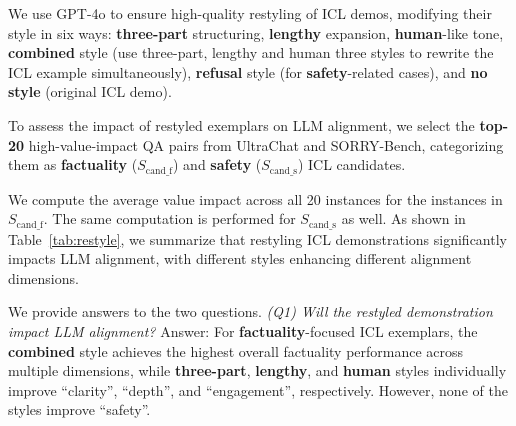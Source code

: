 
We use GPT-4o to ensure high-quality restyling of ICL demos, modifying their style in six ways: \textbf{three-part} structuring, \textbf{lengthy} expansion, \textbf{human}-like tone, \textbf{combined} style (use three-part, lengthy and human three styles to rewrite the ICL example simultaneously), \textbf{refusal} style (for \textbf{\color{myred} safety}-related cases), and \textbf{no style} (original ICL demo).

To assess the impact of restyled exemplars on LLM alignment, we select the \textbf{top-20} high-value-impact QA pairs from UltraChat and SORRY-Bench, categorizing them as \textbf{\color{myblue} factuality} (${S_\text{cand\_f}}$) and \textbf{\color{myred} safety} (${S_\text{cand\_s}}$) ICL candidates.

We compute the average value impact across all 20 instances for the instances in ${S_\text{cand\_f}}$. The same computation is performed for ${S_\text{cand\_s}}$ as well.
As shown in Table~\ref{tab:restyle}, we summarize that restyling ICL demonstrations significantly impacts LLM alignment, with different styles enhancing different alignment dimensions.

We provide answers to the two questions.
\emph{(Q1) Will the restyled demonstration impact LLM alignment?}
Answer: For \textbf{\color{myblue} factuality}-focused ICL exemplars, the \textbf{combined} style achieves the highest overall factuality performance across multiple dimensions, while \textbf{three-part}, \textbf{lengthy}, and \textbf{human} styles individually improve ``clarity'', ``depth'', and ``engagement'', respectively. 
However, none of the styles improve ``safety''.

